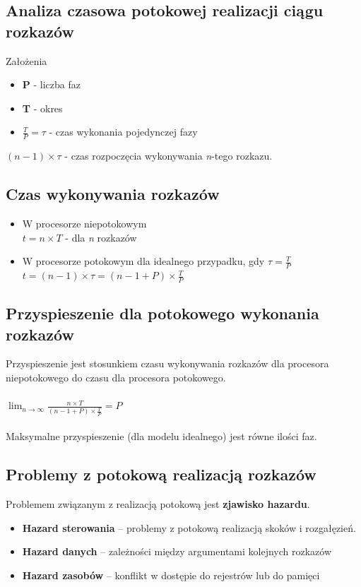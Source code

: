 \documentclass[a4paper,twoside]{article}
\begin{document}
    	\subsection*{Analiza czasowa potokowej realizacji ciągu rozkazów}
    	Założenia
    	\begin{itemize}
    		\item \textbf{P} - liczba faz
    		\item \textbf{T} - okres
    		\item $\frac{T}{P}=\tau $ - czas wykonania pojedynczej fazy
    	\end{itemize}
    	$(n-1)\times\tau$ - czas rozpoczęcia wykonywania \emph{n}-tego rozkazu.
    	\subsection*{Czas wykonywania rozkazów}
    	\begin{itemize}
    		\item W procesorze niepotokowym\\
    		$t=n\times T$ - dla \emph{n} rozkazów
    		\item W procesorze potokowym dla idealnego przypadku, gdy $\tau=\frac{T}{P}$\\
    		$t=(n-1)\times\tau=(n-1+P)\times\frac{T}{P}$
    	\end{itemize}
    	\subsection*{Przyspieszenie dla potokowego wykonania rozkazów}
    	Przyspieszenie jest stosunkiem czasu wykonywania rozkazów dla procesora niepotokowego do czasu dla procesora potokowego.\\\\
    	$\lim_{n \to \infty}\frac{n\times T}{(n-1+P)\times\frac{T}{P}}=P$\\\\
    	Maksymalne przyspieszenie (dla modelu idealnego) jest równe ilości faz.
    	\subsection*{Problemy z potokową realizacją rozkazów}
    	Problemem związanym z realizacją potokową jest \textbf{zjawisko hazardu}.
    	\begin{itemize}
    		\item \textbf{Hazard sterowania }– problemy z potokową realizacją skoków i rozgałęzień.
    		\item \textbf{Hazard danych} – zależności między argumentami kolejnych rozkazów
    		\item \textbf{Hazard zasobów} – konflikt w dostępie do rejestrów lub do pamięci
    	\end{itemize}
\end{document}
